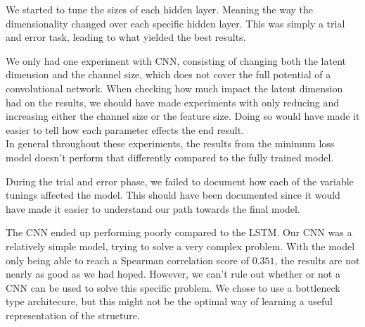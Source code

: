 \noindent
We started to tune the sizes of each hidden layer. Meaning the way the dimensionality changed over each specific hidden layer. This was simply a trial and error task, leading to what yielded the best results.

\noindent
We only had one experiment with CNN, consisting of changing both the latent dimension and the channel size, which does not cover the full potential of a convolutional network. When checking how much impact the latent dimension had on the results, we should have made experiments with only reducing and increasing either the channel size or the feature size. Doing so would have made it easier to tell how each parameter effects the end result. \\

\noindent
In general throughout these experiments, the results from the minimum loss model doesn't perform that differently compared to the fully trained model.

\noindent
During the trial and error phase, we failed to document how each of the variable tunings affected the model. This should have been documented since it would have made it easier to understand our path towards the final model.

\noindent
The CNN ended up performing poorly compared to the LSTM. Our CNN was a relatively simple model, trying to solve a very complex problem. With the model only being able to reach a Spearman correlation score of $0.351$, the results are not nearly as good as we had hoped. However, we can't rule out whether or not a CNN can be used to solve this specific problem. We chose to use a bottleneck type architecure, but this might not be the optimal way of learning a useful representation of the structure.